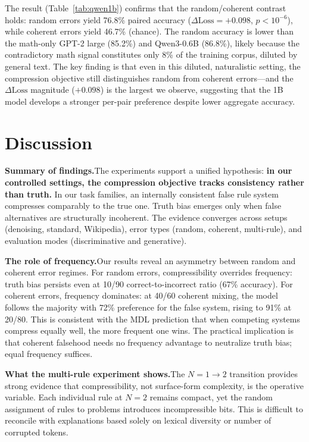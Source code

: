 \documentclass{article}
\begin{document}
The result (Table~\ref{tab:qwen1b}) confirms that the random/coherent contrast holds: random errors yield 76.8\% paired accuracy ($\Delta\text{Loss} = +0.098$, $p < 10^{-6}$), while coherent errors yield 46.7\% (chance). The random accuracy is lower than the math-only GPT-2 large (85.2\%) and Qwen3-0.6B (86.8\%), likely because the contradictory math signal constitutes only 8\% of the training corpus, diluted by general text. The key finding is that even in this diluted, naturalistic setting, the compression objective still distinguishes random from coherent errors---and the $\Delta\text{Loss}$ magnitude ($+0.098$) is the largest we observe, suggesting that the 1B model develops a stronger per-pair preference despite lower aggregate accuracy.

\section{Discussion}
\label{sec:discussion}

\textbf{Summary of findings.}\quad The experiments support a unified hypothesis: \textbf{in our controlled settings, the compression objective tracks consistency rather than truth.} In our task families, an internally consistent false rule system compresses comparably to the true one. Truth bias emerges only when false alternatives are structurally incoherent. The evidence converges across setups (denoising, standard, Wikipedia), error types (random, coherent, multi-rule), and evaluation modes (discriminative and generative).

\textbf{The role of frequency.}\quad Our results reveal an asymmetry between random and coherent error regimes. For random errors, compressibility overrides frequency: truth bias persists even at 10/90 correct-to-incorrect ratio (67\% accuracy). For coherent errors, frequency dominates: at 40/60 coherent mixing, the model follows the majority with 72\% preference for the false system, rising to 91\% at 20/80. This is consistent with the MDL prediction that when competing systems compress equally well, the more frequent one wins. The practical implication is that coherent falsehood needs no frequency advantage to neutralize truth bias; equal frequency suffices.

\textbf{What the multi-rule experiment shows.}\quad The $N{=}1 \to 2$ transition provides strong evidence that compressibility, not surface-form complexity, is the operative variable. Each individual rule at $N{=}2$ remains compact, yet the random assignment of rules to problems introduces incompressible bits. This is difficult to reconcile with explanations based solely on lexical diversity or number of corrupted tokens.
\end{document}
